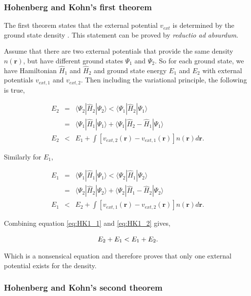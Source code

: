 \subsubsection{Hohenberg and Kohn's first theorem}

The first theorem states that the external potential $v_{ext}$ is determined by the ground state density \cite{Hohenburg_Kohn, DFT_intro_Harrison}.  This statement can be proved by \textit{reductio ad absurdum}. 

Assume that there are two external potentials that provide the same density $n(\mathbf{r})$, but have different ground states $\Psi_1$ and $\Psi_2$.  So for each ground state, we have Hamiltonian $\hat{H}_1$ and $\hat{H}_2$ and ground state energy $E_1$ and $E_2$ with external potentials $v_{ext, 1}$ and $v_{ext, 2}$.  Then including the variational principle, the following is true,

\begin{eqnarray}
\ E_2 &=& \langle \Psi_2 | \hat{H}_2 | \Psi_2 \rangle < \langle \Psi_1 | \hat{H}_2 | \Psi_1 \rangle \\
\ &=& \langle \Psi_1 | \hat{H}_1 | \Psi_1 \rangle + \langle \Psi_1 | \hat{H}_2 - \hat{H}_1 | \Psi_1 \rangle \\ \label{eq:HK1_1}
\ E_2 &<& E_1 + \int [v_{ext, 2} (\mathbf{r}) - v_{ext, 1} (\mathbf{r})]n(\mathbf{r})d\mathbf{r} .
\end{eqnarray}

Similarly for $E_1$,

\begin{eqnarray}
\ E_1 &=& \langle \Psi_1 | \hat{H}_1 | \Psi_1 \rangle < \langle \Psi_2 | \hat{H}_1 | \Psi_2 \rangle \\
\ &=& \langle \Psi_2 | \hat{H}_2 | \Psi_2 \rangle + \langle \Psi_2 | \hat{H}_1 - \hat{H}_2 | \Psi_2 \rangle \\ \label{eq:HK1_2}
\ E_1 &<& E_2 + \int [v_{ext, 1} (\mathbf{r}) - v_{ext, 2} (\mathbf{r})]n(\mathbf{r})d\mathbf{r} .
\end{eqnarray}

Combining equation \ref{eq:HK1_1} and \ref{eq:HK1_2} gives,

\begin{equation}
\ E_2 + E_1 < E_1 + E_2 \\.
\end{equation}

Which is a nonsensical equation and therefore proves that only one external potential exists for the density.

\subsubsection{Hohenberg and Kohn's second theorem}

